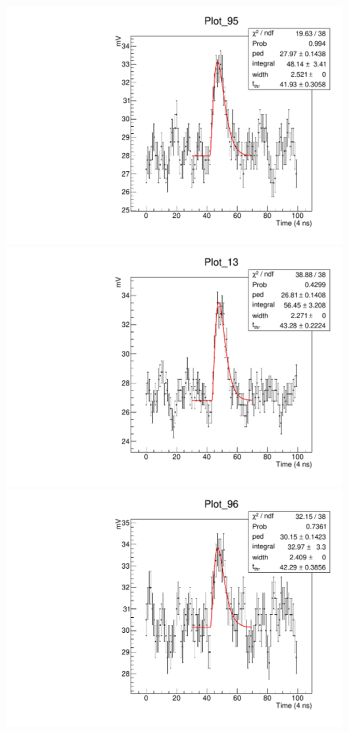 \documentclass[twoside]{article}
\begin{document}
\begin{figure}[H]
\begin{minipage}{0.5\textwidth}
 \includegraphics[width=\textwidth]{pics/rawfit2.pdf}
\end{minipage}\hfill\begin{minipage}{0.5\textwidth}
 \includegraphics[width=\textwidth]{pics/rawfit3.pdf}
 \end{minipage}
 \begin{minipage}{0.5\textwidth}
  \includegraphics[width=\textwidth]{pics/rawfit1.pdf}

\end{minipage}
\end{figure}
\end{document}
